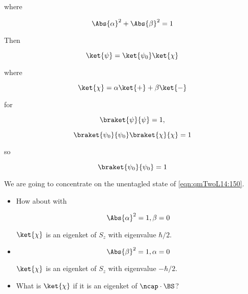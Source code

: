 where 

\begin{equation}\label{eqn:qmTwoL14:250}
\Abs{\alpha}^2 + \Abs{\beta}^2 = 1
\end{equation}

Then

\begin{equation}\label{eqn:qmTwoL14:150}
\ket{\psi} = \ket{\psi_0} \ket{\chi}
\end{equation}

where 

\begin{equation}\label{eqn:qmTwoL14:270}
\ket{\chi} = \alpha \ket{+} + \beta \ket{-}
\end{equation}

for 

\begin{equation}\label{eqn:qmTwoL14:290}
\braket{\psi}{\psi} = 1,
\end{equation}

\begin{equation}\label{eqn:qmTwoL14:310}
\braket{\psi_0}{\psi_0} 
\braket{\chi}{\chi}  = 1
\end{equation}

so

\begin{equation}\label{eqn:qmTwoL14:330}
\braket{\psi_0}{\psi_0} = 1
\end{equation}

We are going to concentrate on the unentagled state of \ref{eqn:qmTwoL14:150}.

\begin{itemize}
\item
How about with

\begin{equation}\label{eqn:qmTwoL14:350}
\Abs{\alpha}^2 = 1, \beta = 0
\end{equation}

$\ket{\chi}$ is an eigenket of $S_z$ with eigenvalue $\hbar/2$.
\item

\begin{equation}\label{eqn:qmTwoL14:370}
\Abs{\beta}^2 = 1, \alpha = 0
\end{equation}

$\ket{\chi}$ is an eigenket of $S_z$ with eigenvalue $-\hbar/2$.

\item
What is $\ket{\chi}$ if it is an eigenket of $\ncap \cdot \BS$?
\end{itemize}

